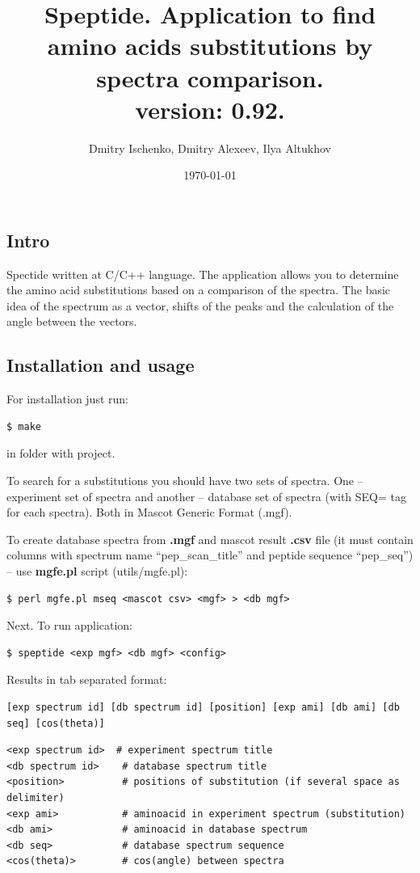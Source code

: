 \documentclass{article}
\title{\textbf{Speptide}. Application to find amino acids substitutions by spectra comparison.
       \\[3ex]
       \normalsize{version: 0.92.}}
\author{Dmitry Ischenko, Dmitry Alexeev, Ilya Altukhov}
\date{{\small\today}}
\begin{document}
\maketitle

\clearpage

\subsection{Intro}
\par
Spectide written at C/C++ language. The application allows you to determine the amino acid substitutions based on a comparison of the spectra. The basic idea of the spectrum as a vector, shifts of the peaks and the calculation of the angle between the vectors.

\subsection{Installation and usage}
\par
For installation just run:
\begin{lstlisting}
$ make
\end{lstlisting}
\par
in folder with project.\\
\par
To search for a substitutions you should have two sets of spectra. One -- experiment set of spectra and another -- database set of spectra (with SEQ= tag for each spectra). Both in Mascot Generic Format (.mgf).\\
\par
To create database spectra from \textbf{.mgf} and mascot result \textbf{.csv} file (it must contain columns with spectrum name ``pep\_scan\_title'' and peptide sequence ``pep\_seq'') -- use \textbf{mgfe.pl} script (utils/mgfe.pl):
\begin{lstlisting}
$ perl mgfe.pl mseq <mascot csv> <mgf> > <db mgf>
\end{lstlisting}
\par
Next. To run application:
\begin{lstlisting}
$ speptide <exp mgf> <db mgf> <config>
\end{lstlisting}
\par
Results in tab separated format:
\begin{lstlisting}
[exp spectrum id] [db spectrum id] [position] [exp ami] [db ami] [db seq] [cos(theta)]
\end{lstlisting}

\begin{lstlisting}
<exp spectrum id>  # experiment spectrum title
<db spectrum id>    # database spectrum title
<position>          # positions of substitution (if several space as delimiter)
<exp ami>           # aminoacid in experiment spectrum (substitution)
<db ami>            # aminoacid in database spectrum
<db seq>            # database spectrum sequence
<cos(theta)>        # cos(angle) between spectra
\end{lstlisting}
\end{document}
